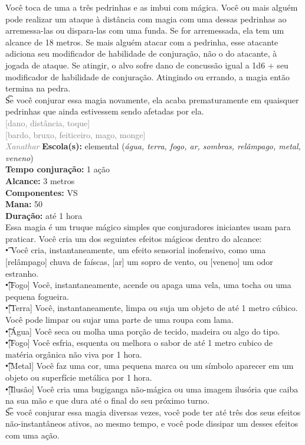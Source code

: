 \documentclass{RPG_Adventure}[2021/10/20]
\begin{document}
{\normalsize Você toca de uma a três pedrinhas e as imbui com mágica. Você ou mais alguém pode realizar um ataque à distância com magia com uma dessas pedrinhas ao arremessa-las ou dispara-las com uma funda. Se for arremessada, ela tem um alcance de 18 metros. Se mais alguém atacar com a pedrinha, esse atacante adiciona seu modificador de habilidade de conjuração, não o do atacante, à jogada de ataque. Se atingir, o alvo sofre dano de concussão igual a 1d6 + seu modificador de habilidade de conjuração. Atingindo ou errando, a magia então termina na pedra.\\\t Se você conjurar essa magia novamente, ela acaba prematuramente em quaisquer pedrinhas que ainda estivessem sendo afetadas por ela.\\}
{\scriptsize \textcolor{gray}{[dano, distância, toque]\\}}
{\scriptsize \textcolor{gray}{[bardo, bruxo, feiticeiro, mago, monge]\\}}
{\tiny \textcolor{gray}{\textit{Xanathar}}}
{\small \t \textbf{Escola(s):} elemental (\textit{água, terra, fogo, ar, sombras, relâmpago, metal, veneno})\\\t \textbf{Tempo conjuração:} 1 ação\\\t \textbf{Alcance:} 3 metros\\\t \textbf{Componentes:} VS\\\t \textbf{Mana:} 50\\\t \textbf{Duração:} até 1 hora\\}
{\normalsize Essa magia é um truque mágico simples que conjuradores iniciantes usam para praticar. Você cria um dos seguintes efeitos mágicos dentro do alcance:\\\t • Você cria, instantaneamente, um efeito sensorial inofensivo, como uma [relâmpago] chuva de faíscas, [ar] um sopro de vento, ou [veneno] um odor estranho.\\\t •[Fogo] Você, instantaneamente, acende ou apaga uma vela, uma tocha ou uma pequena fogueira.\\\t •[Terra] Você, instantaneamente, limpa ou suja um objeto de até 1 metro cúbico. Você pode limpar ou sujar uma parte de uma roupa com lama.\\\t •[Água] Você seca ou molha uma porção de tecido, madeira ou algo do tipo.\\\t •[Fogo] Você esfria, esquenta ou melhora o sabor de até 1 metro cubico de matéria orgânica não viva por 1 hora.\\\t •[Metal] Você faz uma cor, uma pequena marca ou um símbolo aparecer em um objeto ou superfície metálica por 1 hora.\\\t •[Ilusão] Você cria uma bugiganga não-mágica ou uma imagem ilusória que caiba na sua mão e que dura até o final do seu próximo turno.\\\t Se você conjurar essa magia diversas vezes, você pode ter até três dos seus efeitos não-instantâneos ativos, ao mesmo tempo, e você pode dissipar um desses efeitos com uma ação.\\}
\end{document}
